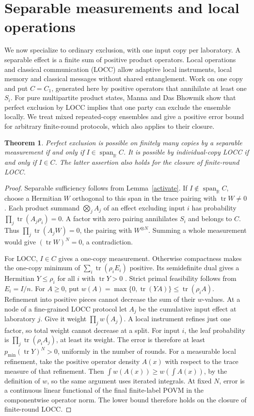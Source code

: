 \documentclass[11pt,a4paper]{article}
\newtheorem{theorem}{Theorem}
\theoremstyle{remark}
\newcommand{\tr}{\operatorname{tr}}
\newcommand{\spn}{\operatorname{span}}
\newcommand{\R}{\mathbb R}
\begin{document}
\section{Separable measurements and local operations}

We now specialize to ordinary exclusion, with one input copy per laboratory. A separable effect is a finite sum of positive product operators. Local operations and classical communication (LOCC) allow adaptive local instruments, local memory and classical messages without shared entanglement. Work on one copy and put \(C=C_1\), generated here by positive operators that annihilate at least one \(S_i\). For pure multipartite product states, Manna and Das Bhowmik \cite[Thm.~2]{Manna} show that perfect exclusion by LOCC implies that one party can exclude the ensemble locally. We treat mixed repeated-copy ensembles and give a positive error bound for arbitrary finite-round protocols, which also applies to their closure.

\begin{theorem}\label{local}
Perfect exclusion is possible on finitely many copies by a separable measurement if and only if \(I\in\spn_{\R}C\). It is possible by individual-copy LOCC if and only if \(I\in C\). The latter assertion also holds for the closure of finite-round LOCC.
\end{theorem}
\begin{proof}
Separable sufficiency follows from Lemma~\ref{activate}. If \(I\notin\spn_{\R}C\), choose a Hermitian \(W\) orthogonal to this span in the trace pairing with \(\tr W\ne0\). Each product summand \(\bigotimes_j A_j\) of an effect excluding input \(i\) has probability \(\prod_j\tr(A_j\rho_i)=0\). A factor with zero pairing annihilates \(S_i\) and belongs to \(C\). Thus \(\prod_j\tr(A_jW)=0\), the pairing with \(W^{\otimes N}\). Summing a whole measurement would give \((\tr W)^N=0\), a contradiction.

For LOCC, \(I\in C\) gives a one-copy measurement. Otherwise compactness makes the one-copy minimum of \(\sum_i\tr(\rho_iE_i)\) positive. Its semidefinite dual gives a Hermitian \(Y\le\rho_i\) for all \(i\) with \(\tr Y>0\) \cite{Bandy}. Strict primal feasibility follows from \(E_i=I/n\). For \(A\ge0\), put \(w(A)=\max\{0,\tr(YA)\}\le\tr(\rho_i A)\). Refinement into positive pieces cannot decrease the sum of their \(w\)-values. At a node of a fine-grained LOCC protocol let \(A_j\) be the cumulative input effect at laboratory \(j\). Give it weight \(\prod_j w(A_j)\). A local instrument refines just one factor, so total weight cannot decrease at a split. For input \(i\), the leaf probability is \(\prod_j\tr(\rho_i A_j)\), at least its weight. The error is therefore at least \(p_{\min}(\tr Y)^N>0\), uniformly in the number of rounds. For a measurable local refinement, take the positive operator density \(A(x)\) with respect to the trace measure of that refinement. Then \(\int w(A(x))\ge w(\int A(x))\), by the definition of \(w\), so the same argument uses iterated integrals. At fixed \(N\), error is a continuous linear functional of the final finite-label POVM in the componentwise operator norm. The lower bound therefore holds on the closure of finite-round LOCC.
\end{proof}
\end{document}
